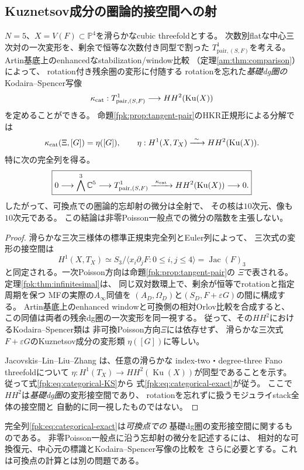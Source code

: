 \subsection{Kuznetsov成分の圏論的接空間への射}
\begin{theorem}[可換点での圏論的忘却射の微分]
\label{fpk:thm:categorical-tangent}
$N=5$、$X=V(F)\subset\mathbb P^4$を滑らかなcubic threefoldとする。
次数別flatな中心三次対の一次変形を、剰余で恒等な次数付き同型で割った
$T^1_{\mathrm{pair},(S,F)}$を考える。
Artin基底上のenhancedなstabilization/window比較
（定理\ref{am:thm:comparison}）によって、
rotation付き残余圏の変形に付随する
rotationを忘れた\emph{基礎dg圏の}Kodaira--Spencer写像
\[
 \kappa_{\rm cat}:T^1_{\mathrm{pair},(S,F)}
 \longrightarrow HH^2(\operatorname{Ku}(X))
\]
を定めることができる。
命題\ref{fpk:prop:tangent-pair}のHKR正規形による分解では
\begin{equation}\label{fpk:eq:categorical-KS}
 \kappa_{\rm cat}(\Xi,[G])=\eta([G]),
 \qquad
 \eta:H^1(X,T_X)\xrightarrow{\ \sim\ }HH^2(\operatorname{Ku}(X)).
\end{equation}
特に次の完全列を得る。
\begin{equation}\label{fpk:eq:categorical-exact}
 \boxed{
 0\longrightarrow\bigwedge^3\mathbb C^5
 \longrightarrow T^1_{\mathrm{pair},(S,F)}
 \xrightarrow{\ \kappa_{\rm cat}\ }
 HH^2(\operatorname{Ku}(X))
 \longrightarrow0 .
 }
\end{equation}
したがって、可換点での圏論的忘却射の微分は全射で、
その核は$10$次元、像も$10$次元である。
この結論は非零Poisson一般点での微分の階数を主張しない。
\end{theorem}
\begin{proof}
滑らかな三次三様体の標準正規束完全列とEuler列によって、
三次式の変形の接空間は
\[
 H^1(X,T_X)\simeq
 S_3/\langle x_i\partial_jF:0\le i,j\le4\rangle
 =\operatorname{Jac}(F)_3
\]
と同定される。一次Poisson方向は命題\ref{fpk:prop:tangent-pair}の
$\Xi$で表される。定理\ref{fpk:thm:infinitesimal}は、
同じ双対数環上で、剰余が恒等でrotationと指定周期を保つ
MFの実際の$A_\infty$同値を
$(A_D,\Omega_D)$と$(S_D,F+\varepsilon G)$の間に構成する。
Artin基底上のenhanced windowと可換側の相対Orlov比較を合成すると、
この同値は両者の残余dg圏の一次変形を同一視する。
従って、その$HH^2$におけるKodaira--Spencer類は
非可換Poisson方向$\Xi$には依存せず、
滑らかな三次式$F+\varepsilon G$のKuznetsov成分の変形類
$\eta([G])$に等しい。

Jacovskis--Lin--Liu--Zhang
\cite[Theorem~4.4(2)]{JLLZ}は、任意の滑らかな
index-two・degree-three Fano threefoldについて
$\eta:H^1(T_X)\to HH^2(\operatorname{Ku}(X))$が同型であることを示す。
従って式\eqref{fpk:eq:categorical-KS}から
式\eqref{fpk:eq:categorical-exact}が従う。
ここで$HH^2$は\emph{基礎dg圏}の変形接空間であり、
rotationを忘れずに扱うモジュライstack全体の接空間と
自動的に同一視したものではない。
\end{proof}
\begin{remark}[圏論的微分と相対復元]
\label{fpk:rem:categorical-scope}
完全列\eqref{fpk:eq:categorical-exact}は\emph{可換点での}
基礎dg圏の変形接空間に関するものである。
非零Poisson一般点に沿う忘却射の微分を記述するには、
相対的な可換復元、中心元の標識とKodaira--Spencer写像の比較を
さらに必要とする。これは可換点の計算とは別の問題である。
\end{remark}

